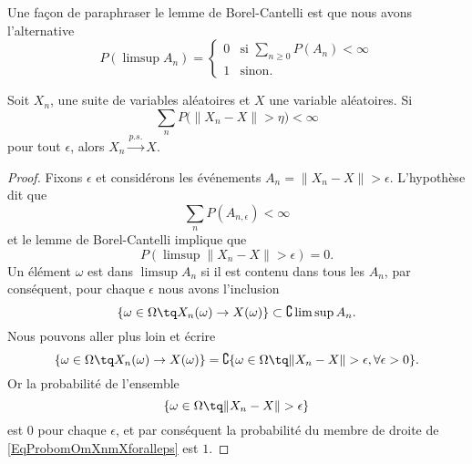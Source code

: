 Une façon de paraphraser le lemme de Borel-Cantelli est que nous avons l'alternative
\begin{equation}    \label{EqparaphrCantelli}
    P(\limsup A_n)=\begin{cases}
        0    &   \text{si $\sum_{n\geq 0}P(A_n)<\infty$}\\
        1    &    \text{sinon}.
    \end{cases}
\end{equation}

\begin{proposition}
    Soit \( X_n\), une suite de variables aléatoires et \( X\) une variable aléatoires. Si
    \begin{equation}
        \sum_nP\big( \| X_n-X \|>\eta \big)<\infty
    \end{equation}
    pour tout \( \epsilon\), alors \( X_n\stackrel{p.s.}{\longrightarrow}X\).
\end{proposition}

\begin{proof}
    Fixons \( \epsilon\) et considérons les événements \( A_{n}=\| X_n-X \|>\epsilon\). L'hypothèse dit que
    \begin{equation}
        \sum_nP(A_{n,\epsilon})<\infty
    \end{equation}
    et le lemme de Borel-Cantelli implique que
    \begin{equation}
        P(\limsup\| X_n-X \|>\epsilon)=0.
    \end{equation}
    Un élément \( \omega\) est dans \( \limsup A_n\) si il est contenu dans tous les \( A_n\), par conséquent, pour chaque \( \epsilon\) nous avons l'inclusion
    \begin{equation}
        \{ \omega\in\Omega\tq X_n(\omega)\to X(\omega) \}\subset\complement\limsup A_n.
    \end{equation}
    Nous pouvons aller plus loin et écrire
    \begin{equation}        \label{EqProbomOmXnmXforalleps}
        \{ \omega\in\Omega\tq X_n(\omega)\to X(\omega) \}=\complement\{ \omega\in\Omega\tq \| X_n-X \|>\epsilon,\forall\epsilon>0 \}.
    \end{equation}
    Or la probabilité de l'ensemble
    \begin{equation}
        \{ \omega\in\Omega\tq\| X_n-X \|>\epsilon \}
    \end{equation}
    est \( 0\) pour chaque \( \epsilon\), et par conséquent la probabilité du membre de droite de \eqref{EqProbomOmXnmXforalleps} est \( 1\).
\end{proof}

